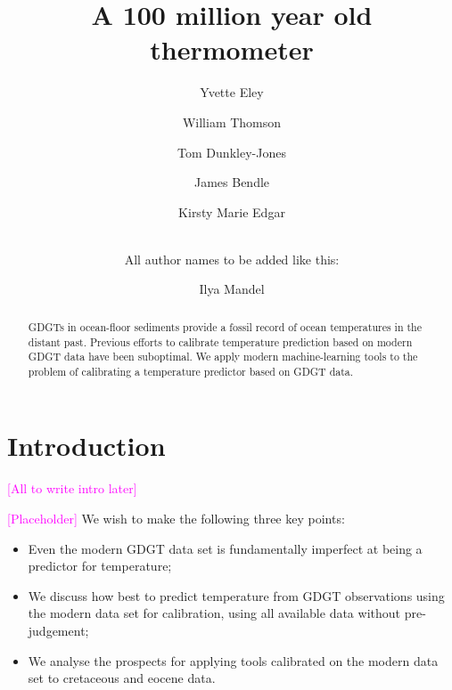 \documentclass[rmp,aps,twocolumn]{revtex4-1}
\newcommand{\ilya}[1]{\textcolor{magenta}{#1}}
\begin{document}
\title{A 100 million year old thermometer}

\author{Yvette Eley}
\author{William Thomson}
\author{Tom Dunkley-Jones}
\author{James Bendle}
\author{Kirsty Marie Edgar}
\author{\\All author names to be added like this:\\}


\author{Ilya Mandel}

\begin{abstract}

GDGTs in ocean-floor sediments provide a fossil record of ocean temperatures in the distant past.  Previous efforts to calibrate temperature prediction based on modern GDGT data have been suboptimal.  We apply modern machine-learning tools to the problem of calibrating a temperature predictor based on GDGT data.

\end{abstract}

\maketitle

\section{Introduction}

\ilya{[All to write intro later]}

\ilya{[Placeholder]} We wish to make the following three key points:

\begin{itemize}

\item Even the modern GDGT data set is fundamentally imperfect at being a predictor for temperature;

\item We discuss how best to predict temperature from GDGT observations using the modern data set for calibration, using all available data without pre-judgement;

\item We analyse the prospects for applying tools calibrated on the modern data set to cretaceous and eocene data.

\end{itemize}
\end{document}
